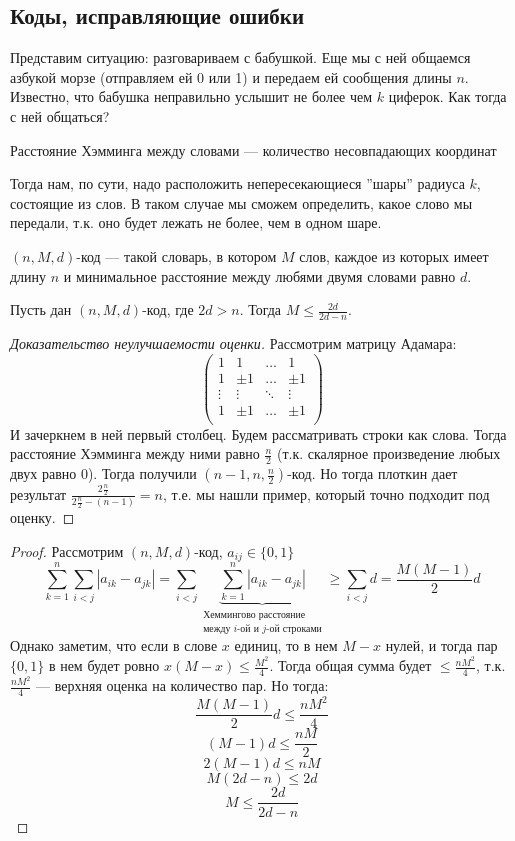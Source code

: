 \subsection{Коды, исправляющие ошибки}
Представим ситуацию: разговариваем с бабушкой. Еще мы с ней общаемся азбукой морзе (отправляем ей 0 или 1) и передаем ей сообщения длины \(n\). Известно, что бабушка неправильно услышит не более чем \(k\) циферок. Как тогда с ней общаться?
\begin{definition}
    Расстояние Хэмминга между словами --- количество несовпадающих координат
\end{definition}
Тогда нам, по сути, надо расположить непересекающиеся ''шары'' радиуса \(k\), состоящие из слов. В таком случае мы сможем определить, какое слово мы передали, т.к. оно будет лежать не более, чем в одном шаре.
\begin{definition}
    \((n, M, d)\)-код --- такой словарь, в котором \(M\) слов, каждое из которых имеет длину \(n\) и минимальное расстояние между любями двумя словами равно \(d\).
\end{definition}
\begin{theorem}
    Пусть дан \((n, M, d)\)-код, где \(2d > n\). Тогда \(M  \le \frac{2d}{2d - n}\).
\end{theorem}
\begin{proof}[Доказательство неулучшаемости оценки]
    Рассмотрим матрицу Адамара:
    \[\left(\begin{array}{cccc}
        1 & 1 & \dots &  1 \\
        1 & \pm 1 & \dots & \pm 1 \\
        \vdots & \vdots & \ddots & \vdots\\
        1 & \pm 1 & \dots & \pm 1 \\
    \end{array}\right)\]
    И зачеркнем в ней первый столбец. Будем рассматривать строки как слова. Тогда расстояние Хэмминга между ними равно \(\frac{n}{2}\) (т.к. скалярное произведение любых двух равно 0). Тогда получили \(\left(n-1, n, \frac{n}{2}\right)\)-код. Но тогда плоткин дает результат \(\frac{2\frac{n}{2}}{2\frac{n}{2} - (n - 1)} = n\), т.е. мы нашли пример, который точно подходит под оценку.
\end{proof}
\begin{proof}
    Рассмотрим \((n, M, d)\)-код, \(a_{ij} \in \{0, 1\}\)
    \[\sum_{k = 1}^n\sum_{i < j} |a_{ik} - a_{jk}| = \sum_{i < j}\underbrace{\sum_{k = 1}^n|a_{ik} - a_{jk}|}_{\begin{array}{c}
        \text{Хеммингово расстояние} \\
        \text{между \(i\)-ой и \(j\)-ой строками}
    \end{array}}  \ge \sum_{i < j}d = \frac{M(M - 1)}{2}d\]
    Однако заметим, что если в слове \(x\) единиц, то в нем \(M - x\) нулей, и тогда пар \(\{0, 1\}\) в нем будет ровно \(x(M - x) \le \frac{M^2}{4}\). Тогда общая сумма будет \(\le \frac{nM^2}{4}\), т.к. \(\frac{nM^2}{4}\) --- верхняя оценка на количество пар. Но тогда:
    \[\frac{M(M  - 1)}{2}d \le \frac{nM^2}{4}\]
    \[(M  - 1)d \le \frac{nM}{2}\]
    \[2(M - 1)d \le nM\]
    \[M(2d - n) \le 2d\]
    \[M \le \frac{2d}{2d - n}\]
\end{proof}